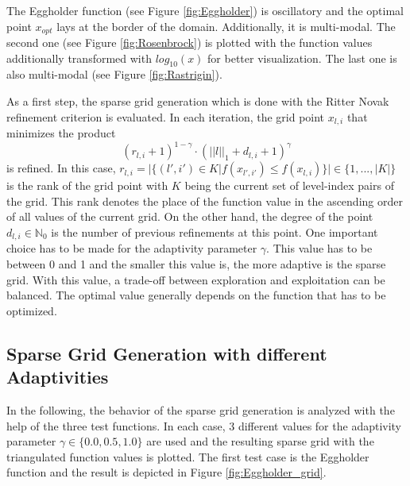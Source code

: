 The Eggholder function (see Figure \ref{fig:Eggholder}) is oscillatory and the optimal point $ x_{opt} $ lays at the border of the domain. Additionally, it is multi-modal. The second one (see Figure \ref{fig:Rosenbrock}) is plotted with the function values additionally transformed with $ log_{10}(x) $ for better visualization. The last one is also multi-modal (see Figure \ref{fig:Rastrigin}). 

As a first step, the sparse grid generation which is done with the Ritter Novak refinement criterion \cite{b_splines} is evaluated. In each iteration, the grid point $ x_{l,i} $ that minimizes the product 
\begin{equation}
	(r_{l,i} +1)^{1 - \gamma} \cdot (||l||_1 + d_{l,i} + 1)^{\gamma}
\end{equation}
is refined. In this case, $ r_{l,i} = |\{ (l', i') \in K | f(x_{l',i'}) \le f(x_{l,i}) \}| \in \{1, ... , |K|\} $ is the rank of the grid point with $ K $ being the current set of level-index pairs of the grid. This rank denotes the place of the function value in the ascending order of all values of the current grid. On the other hand, the degree of the point $ d_{l,i} \in \mathbb{N}_0 $ is the number of previous refinements at this point. One important choice has to be made for the adaptivity parameter $ \gamma $. This value has to be between 0 and 1 and the smaller this value is, the more adaptive is the sparse grid. With this value, a trade-off between exploration and exploitation can be balanced. The optimal value generally depends on the function that has to be optimized. \newline

\subsection{Sparse Grid Generation with different Adaptivities}

In the following, the behavior of the sparse grid generation is analyzed with the help of the three test functions. In each case, 3 different values for the adaptivity parameter $ \gamma \in \{0.0, 0.5, 1.0\} $ are used and the resulting sparse grid with the triangulated function values is plotted. The first test case is the Eggholder function and the result is depicted in Figure \ref{fig:Eggholder_grid}.

